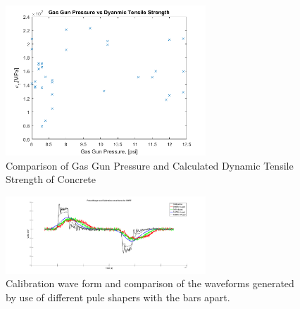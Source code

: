 \documentclass[12pt]{article}
\begin{document}
\begin{figure}[H]
	\centering
	\includegraphics[width=0.67\textwidth]{Pressure_TensileStrength.png}
	\caption{Comparison of Gas Gun Pressure and Calculated Dynamic Tensile Strength of Concrete}
	\label{fig:GasGun}
\end{figure}

\begin{figure}[H]
	\centering
	\includegraphics[width=0.67\textwidth]{pulseshaper.png}
	\caption{Calibration wave form and  comparison of the waveforms generated by use of different pule shapers with the bars apart.}
	\label{fig:pusleshaper}
\end{figure}
\end{document}
